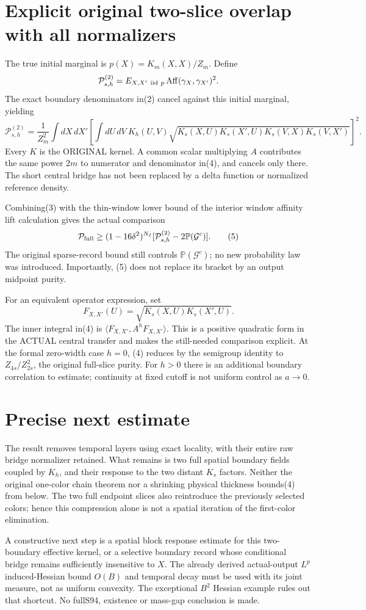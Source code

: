 \documentclass{article}
\begin{document}
\section*{Explicit original two-slice overlap with all normalizers}
The true initial marginal is $p(X)=K_m(X,X)/Z_m$. Define
\[
 \mathcal P_{s,h}^{(2)}
 =E_{X,X'\ {\rm iid}\ p}\operatorname{Aff}(\gamma_X,\gamma_{X'})^2.
\]
The exact boundary denominators in(2) cancel against this initial marginal, yielding
\[
 \mathcal P_{s,h}^{(2)}=\frac1{Z_m^2}\int dX\,dX'
 \left[\int dU\,dV\ K_h(U,V)
 \sqrt{K_s(X,U)K_s(X',U)K_s(V,X)K_s(V,X')}\right]^2.   \tag{4}
\]
Every $K$ is the ORIGINAL kernel. A common scalar multiplying $A$ contributes the same power $2m$ to numerator and denominator in(4), and cancels only there. The short central bridge has not been replaced by a delta function or normalized reference density.

Combining(3) with the thin-window lower bound of the interior window affinity lift calculation gives the actual comparison
\[
 \mathcal P_{\rm full}
 \ge(1-16\delta^2)^{N_I}
       [\mathcal P_{s,h}^{(2)}-2\mathbb P(\mathcal G^c)].                \tag{5}
\]
The original sparse-record bound still controls $\mathbb P(\mathcal G^c)$; no new probability law was introduced. Importantly, (5) does not replace its bracket by an output midpoint purity.

For an equivalent operator expression, set
\[
 F_{X,X'}(U)=\sqrt{K_s(X,U)K_s(X',U)}.
\]
The inner integral in(4) is $\langle F_{X,X'},A^h F_{X,X'}\rangle$. This is a positive quadratic form in the ACTUAL central transfer and makes the still-needed comparison explicit. At the formal zero-width case $h=0$, (4) reduces by the semigroup identity to $Z_{4s}/Z_{2s}^2$, the original full-slice purity. For $h>0$ there is an additional boundary correlation to estimate; continuity at fixed cutoff is not uniform control as $a\to0$.

\section*{Precise next estimate}
The result removes temporal layers using exact locality, with their entire raw bridge normalizer retained. What remains is two full spatial boundary fields coupled by $K_h$, and their response to the two distant $K_s$ factors. Neither the original one-color chain theorem nor a shrinking physical thickness bounds(4) from below. The two full endpoint slices also reintroduce the previously selected colors; hence this compression alone is not a spatial iteration of the first-color elimination.

A constructive next step is a spatial block response estimate for this two-boundary effective kernel, or a selective boundary record whose conditional bridge remains sufficiently insensitive to $X$. The already derived actual-output $L^p$ induced-Hessian bound $O(B)$ and temporal decay must be used with its joint measure, not as uniform convexity. The exceptional $B^2$ Hessian example rules out that shortcut. No fullS94, existence or mass-gap conclusion is made.
\end{document}
